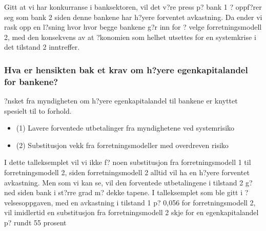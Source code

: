 \documentclass[a4paper,notitlepage]{article}
\begin{document}
Gitt at vi har konkurranse  i banksektoren, vil det v?re press p? bank 1 ? oppf?rer seg som bank 2 siden denne bankene har h?yere forventet avkastning. Da ender vi rask opp en l?sning hvor hvor begge bankene g?r inn for ? velge forretningsmodell 2, med den konsekvens av at ?konomien som helhet utsettes for en systemkrise  i det tilstand 2 inntreffer.
\subsubsection{Hva er hensikten bak et krav om h?yere egenkapitalandel for bankene?}
?nsket fra myndigheten om h?yere egenkapitalandel til bankene er knyttet spesielt til to forhold.
\begin{itemize}
\item (1) Lavere forventede utbetalinger fra myndighetene ved systemrisiko
\item (2) Substitusjon vekk fra forretningsmodeller med overdreven risiko
\end{itemize}
I dette talleksemplet vil vi ikke f? noen substitusjon fra forretningsmodell 1 til forretningsmodell 2, siden forretningsmodell 2 alltid vil ha en h?yere forventet avkastning. Men som vi kan se, vil den forventede utbetalingene i tilstand 2 g? ned siden bank i st?rre grad m? dekke tapene. I talleksemplet som ble gitt i ?velsesoppgaven, med en avkastning i tilstand 1 p? 0,056 for forretningsmodell 2, vil imidlertid en  substitusjon fra forretningsmodell 2 skje for en egenkapitalandel p? rundt 55 prosent
\end{document}
